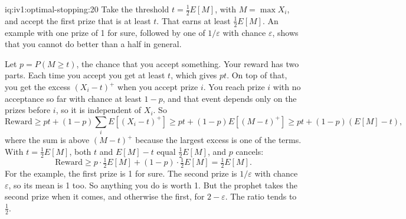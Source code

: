 \begin{solution}{iq:iv1:optimal-stopping:20}
Take the threshold $t = \tfrac12 E[M]$, with $M = \max X_i$, and accept the first prize that is at least $t$. That earns at least $\tfrac12 E[M]$. An example with one prize of 1 for sure, followed by one of $1/\varepsilon$ with chance $\varepsilon$, shows that you cannot do better than a half in general.

Let $p = P(M \ge t)$, the chance that you accept something. Your reward has two parts. Each time you accept you get at least $t$, which gives $pt$. On top of that, you get the excess $(X_i - t)^+$ when you accept prize $i$. You reach prize $i$ with no acceptance so far with chance at least $1 - p$, and that event depends only on the prizes before $i$, so it is independent of $X_i$. So
\[
\text{Reward} \ge pt + (1 - p)\sum_i E[(X_i - t)^+] \ge pt + (1 - p) E[(M - t)^+] \ge pt + (1 - p)(E[M] - t),
\]
where the sum is above $(M - t)^+$ because the largest excess is one of the terms. With $t = \tfrac12 E[M]$, both $t$ and $E[M] - t$ equal $\tfrac12 E[M]$, and $p$ cancels:
\[
\text{Reward} \ge p \cdot \tfrac12 E[M] + (1 - p) \cdot \tfrac12 E[M] = \tfrac12 E[M].
\]
For the example, the first prize is 1 for sure. The second prize is $1/\varepsilon$ with chance $\varepsilon$, so its mean is 1 too. So anything you do is worth 1. But the prophet takes the second prize when it comes, and otherwise the first, for $2 - \varepsilon$. The ratio tends to $\tfrac12$.

\end{solution}
